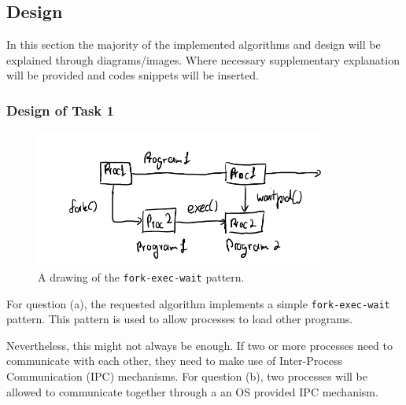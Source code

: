 \documentclass[12pt]{article}
\DeclareRobustCommand{\ul}[1]{%
	\uline{\phantom{#1}}%
	\llap{\contour{white}{#1}}%
}
\begin{document}
\begin{center}
\begin{minipage}[t]{0.3\textwidth}
\end{minipage}
\begin{minipage}[t]{0.3\textwidth}
\end{minipage}
\begin{minipage}[t]{0.3\textwidth}
\end{minipage}
\end{center}

\subsection{Design}

In this section the majority of the implemented algorithms and
design will be explained through diagrams/images. Where
necessary supplementary explanation will be provided and codes
snippets will be inserted.

\subsubsection{Design of Task 1}

\begin{figure}[H]
\centering
\includegraphics[height=4.5cm]{task1qa}
\caption{A drawing of the \texttt{fork-exec-wait} pattern.}
\end{figure}

For question (a), the requested algorithm implements a simple
\texttt{fork-exec-wait} pattern. This pattern is used to allow
processes to load other programs.

Nevertheless, this might not always be enough. If two or more
processes need to communicate with each other, they need to make
use of Inter-Process Communication (IPC) mechanisms. For
question (b), two processes will be allowed to communicate
together through a \ul{pipe} an OS provided IPC mechanism.
\end{document}
